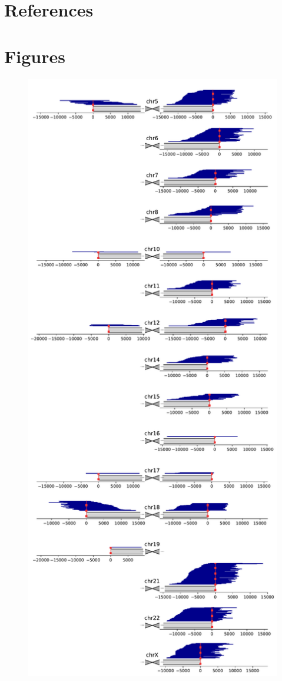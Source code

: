 \documentclass{article}
\begin{document}
\section*{References} 
\begingroup \raggedright \singlespacing \printbibliography[heading=none] \endgroup

\pagebreak
\section*{Figures} 

\begin{figure}[h!] \centering
\includegraphics[height=.85\textheight,width=\textwidth,keepaspectratio]{figures/HG002-alignment.pdf}

\end{figure}
\end{document}
